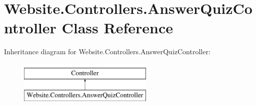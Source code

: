 \hypertarget{class_website_1_1_controllers_1_1_answer_quiz_controller}{}\section{Website.\+Controllers.\+Answer\+Quiz\+Controller Class Reference}
\label{class_website_1_1_controllers_1_1_answer_quiz_controller}
Inheritance diagram for Website.\+Controllers.\+Answer\+Quiz\+Controller\+:\begin{figure}[H]
\begin{center}
\leavevmode
\includegraphics[height=2.000000cm]{class_website_1_1_controllers_1_1_answer_quiz_controller}
\end{center}
\end{figure}
